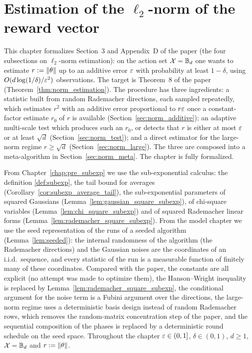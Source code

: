 \chapter{Estimation of the \texorpdfstring{$\ell_2$}{l2}-norm of the reward vector}
\label{chap:norm}

This chapter formalizes Section~3 and Appendix~D of the paper (the four subsections on
$\ell_2$-norm estimation): on the action set $\mathcal{X} = \mathbb{B}_d$ one wants to estimate
$r := \lVert \theta \rVert$ up to an additive error $\varepsilon$ with probability at least $1-\delta$,
using $O(d\log(1/\delta)/\varepsilon^2)$ observations. The target is Theorem~8 of the paper
(Theorem~\ref{thm:norm_estimation}). The procedure has three ingredients: a statistic
built from random Rademacher directions, each sampled repeatedly, which estimates $r^2$ with
an additive error proportional to $r\varepsilon$ once a constant-factor estimate $r_0$ of $r$ is
available (Section~\ref{sec:norm_additive}); an adaptive multi-scale test which produces
such an $r_0$, or detects that $r$ is either at most $\varepsilon$ or at least $\sqrt d$
(Section~\ref{sec:norm_test}); and a direct estimator for the large-norm regime
$r \ge \sqrt d$ (Section~\ref{sec:norm_large}). The three are composed into a
meta-algorithm in Section~\ref{sec:norm_meta}. The chapter is fully formalized.

From Chapter~\ref{chap:pre_subexp} we use the sub-exponential calculus: the definition
\ref{def:subexp}, the tail bound for averages (Corollary~\ref{cor:subexp_average_tail}), the
sub-exponential parameters of squared Gaussians (Lemma~\ref{lem:gaussian_square_subexp}), of
chi-square variables (Lemma~\ref{lem:chi_square_subexp}) and of squared Rademacher linear
forms (Lemma~\ref{lem:rademacher_square_subexp}). From the model chapter we use the seed
representation of the runs of a seeded algorithm (Lemma~\ref{lem:seeded}): the internal
randomness of the algorithm (the Rademacher directions) and the Gaussian noises are the
coordinates of an i.i.d.\ sequence, and every statistic of the run is a measurable
function of finitely many of these coordinates. Compared with the paper, the constants are
all explicit (no attempt was made to optimize them), the Hanson--Wright inequality is
replaced by Lemma~\ref{lem:rademacher_square_subexp}, the conditional argument for the noise
term is a Fubini argument over the directions, the large-norm regime uses a deterministic
basis design instead of random Rademacher rows, which removes the random-matrix
concentration step of the paper, and the sequential composition of the phases is replaced
by a deterministic round schedule on the seed space. Throughout the chapter $\varepsilon \in (0,1]$, $\delta \in (0,1)$, $d \ge 1$,
$\mathcal{X} = \mathbb{B}_d$ and $r := \lVert \theta \rVert$.

